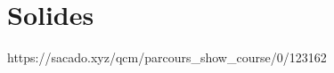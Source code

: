 %
%
%
%
%
%
%
%
%
%


\chapter{Solides}
{https://sacado.xyz/qcm/parcours_show_course/0/123162}

%


